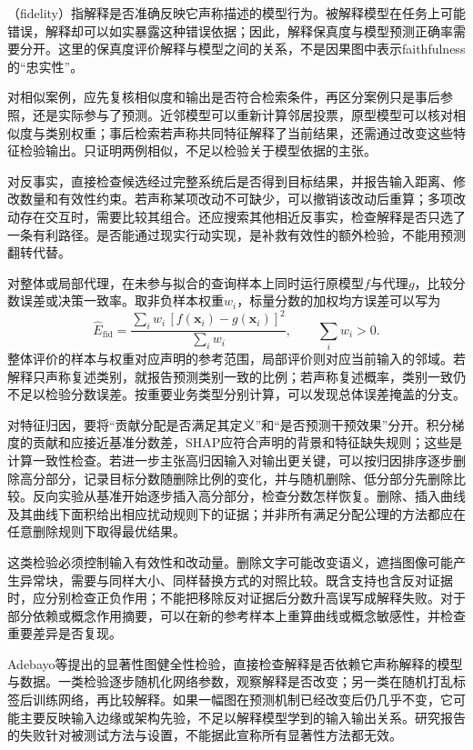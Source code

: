（fidelity）指解释是否准确反映它声称描述的模型行为。被解释模型在任务上可能错误，解释却可以如实暴露这种错误依据；因此，解释保真度与模型预测正确率需要分开。这里的保真度评价解释与模型之间的关系，不是因果图中表示faithfulness的“忠实性”。

对相似案例，应先复核相似度和输出是否符合检索条件，再区分案例只是事后参照，还是实际参与了预测。近邻模型可以重新计算邻居投票，原型模型可以核对相似度与类别权重；事后检索若声称共同特征解释了当前结果，还需通过改变这些特征检验输出。只证明两例相似，不足以检验关于模型依据的主张。

对反事实，直接检查候选经过完整系统后是否得到目标结果，并报告输入距离、修改数量和有效性约束。若声称某项改动不可缺少，可以撤销该改动后重算；多项改动存在交互时，需要比较其组合。还应搜索其他相近反事实，检查解释是否只选了一条有利路径。是否能通过现实行动实现，是补救有效性的额外检验，不能用预测翻转代替。

对整体或局部代理，在未参与拟合的查询样本上同时运行原模型$f$与代理$g$，比较分数误差或决策一致率。取非负样本权重$w_i$，标量分数的加权均方误差可以写为
\[
 \widehat E_{\mathrm{fid}}
 =\frac{\sum_i w_i\,[f(\bm{x}_i)-g(\bm{x}_i)]^2}
        {\sum_i w_i},\qquad \sum_iw_i>0.
\]
整体评价的样本与权重对应声明的参考范围，局部评价则对应当前输入的邻域。若解释只声称复述类别，就报告预测类别一致的比例；若声称复述概率，类别一致仍不足以检验分数误差。按重要业务类型分别计算，可以发现总体误差掩盖的分支。

对特征归因，要将“贡献分配是否满足其定义”和“是否预测干预效果”分开。积分梯度的贡献和应接近基准分数差，SHAP应符合声明的背景和特征缺失规则；这些是计算一致性检查。若进一步主张高归因输入对输出更关键，可以按归因排序逐步删除高分部分，记录目标分数随删除比例的变化，并与随机删除、低分部分先删除比较。反向实验从基准开始逐步插入高分部分，检查分数怎样恢复。删除、插入曲线及其曲线下面积给出相应扰动规则下的证据；并非所有满足分配公理的方法都应在任意删除规则下取得最优结果。

这类检验必须控制输入有效性和改动量。删除文字可能改变语义，遮挡图像可能产生异常块，需要与同样大小、同样替换方式的对照比较。既含支持也含反对证据时，应分别检查正负作用；不能把移除反对证据后分数升高误写成解释失败。对于部分依赖或概念作用摘要，可以在新的参考样本上重算曲线或概念敏感性，并检查重要差异是否复现。

Adebayo等提出的显著性图健全性检验，直接检查解释是否依赖它声称解释的模型与数据。一类检验逐步随机化网络参数，观察解释是否改变；另一类在随机打乱标签后训练网络，再比较解释。如果一幅图在预测机制已经改变后仍几乎不变，它可能主要反映输入边缘或架构先验，不足以解释模型学到的输入输出关系。研究报告的失败针对被测试方法与设置，不能据此宣称所有显著性方法都无效。

